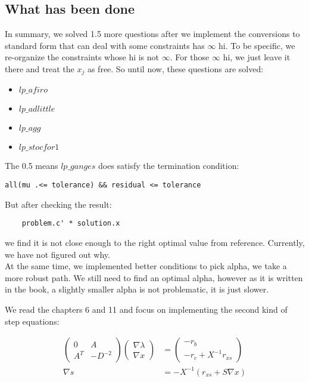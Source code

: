 \subsection{What has been done}\label{section:done}
In summary, we solved 1.5 more questions after we implement the conversions to standard form that can deal with some constraints has $\infty$ hi. To be  specific, we re-organize the constraints whose hi is not $\infty$. For those $\infty$ hi, we just leave it there and treat the $x_j$ as free. 
So until now, these questions are solved: 

\begin{itemize}
    \item $lp\_afiro$
    \item $lp\_adlittle$
    \item $lp\_agg$
    \item $lp\_stocfor1$
\end{itemize}

The 0.5 means $lp\_ganges$ does satisfy the termination condition: 

\begin{lstlisting}
all(mu .<= tolerance) && residual <= tolerance
\end{lstlisting}

But after checking the result: 
\begin{lstlisting}
    problem.c' * solution.x
\end{lstlisting}
we find it is not close enough to the right optimal value from reference. Currently, we have not figured out why. \\

At the same time, we implemented better conditions to pick alpha, we take a more robust path. We still need to find an optimal alpha, however as it is written in the book, a slightly smaller alpha is not problematic, it is just slower. 

We read the chapters 6 and 11 and focus on implementing the second kind of step equations: 

\begin{align*}
   \begin{pmatrix}
    0 & A \\ 
    A^T & -D^{-2}
   \end{pmatrix} 
   \begin{pmatrix}
   \nabla \lambda \\
   \nabla x
   \end{pmatrix}
   &= \begin{pmatrix}
   -r_b \\
   -r_c + X^{-1} r_{xs}
   \end{pmatrix} \\
   \nabla s    &= -X^{-1} (r_{xs} + S \nabla x)
\end{align*}

